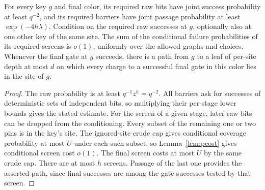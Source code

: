 \begin{lemma}\label{lem:final-gates}
For every key \(g\) and final color, its required raw bits have joint
success probability at least \(q^{-2}\), and its required barriers
have joint passage probability at least \(\exp(-4h\lambda)\).
Condition on the required raw successes at \(g\), optionally also
at one other key of the same site. The sum of the conditional
failure probabilities of its required screens is \(o(1)\), uniformly
over the allowed graphs and choices. Whenever the final gate at
\(g\) succeeds, there is a path from \(g\) to a leaf of per-site depth
at most \(d\) on which every charge to a successful final gate in
this color lies in the site of \(g\).
\end{lemma}

\begin{proof}
The raw probability is at least \(q^{-1}z^h=q^{-2}\). All barriers
ask for successes of deterministic sets of independent bits, so
multiplying their per-stage lower bounds gives the stated estimate.
For the screen of a given stage, later raw bits can be dropped from
the conditioning. Every subset of the remaining one or two pins is
in the key's site. The ignored-site crude cap gives conditional
coverage probability at most \(U\) under each such subset, so
Lemma~\ref{lem:pcost} gives conditional screen cost \(o(1)\).
The final screen costs at most \(U\) by the same crude cap. There
are at most \(h\) screens. Passage of the last one provides the
asserted path, since final successes are among the gate successes
tested by that screen.
\end{proof}
